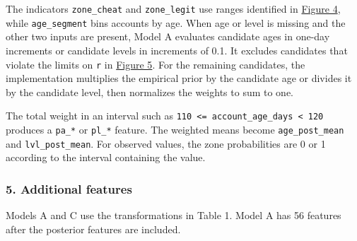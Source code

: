 \documentclass[11pt,a4paper]{article}
\newcommand{\reserveheading}[1]{\par\ifdim\dimexpr\pagegoal-\pagetotal\relax<#1\relax\newpage\fi}
\begin{document}
The indicators \texttt{zone\_\allowbreak{}cheat} and \texttt{zone\_\allowbreak{}legit} use ranges identified in \hyperlink{task1-figure-4}{Figure 4}, while \texttt{age\_\allowbreak{}segment} bins accounts by age. When age or level is missing and the other two inputs are present, Model A evaluates candidate ages in one-day increments or candidate levels in increments of 0.1. It excludes candidates that violate the limits on \texttt{r} in \hyperlink{task1-figure-5}{Figure 5}. For the remaining candidates, the implementation multiplies the empirical prior by the candidate age or divides it by the candidate level, then normalizes the weights to sum to one.

The total weight in an interval such as \texttt{110 <= account\_\allowbreak{}age\_\allowbreak{}days < 120} produces a \texttt{pa\_\allowbreak{}*} or \texttt{pl\_\allowbreak{}*} feature. The weighted means become \texttt{age\_\allowbreak{}post\_\allowbreak{}mean} and \texttt{lvl\_\allowbreak{}post\_\allowbreak{}mean}. For observed values, the zone probabilities are 0 or 1 according to the interval containing the value.

\reserveheading{11\baselineskip}
\subsubsection*{5. Additional features}

Models A and C use the transformations in Table 1. Model A has 56 features after the posterior features are included.
\end{document}
